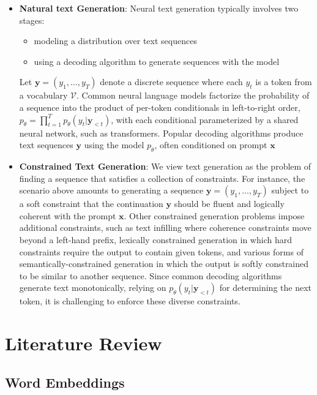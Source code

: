 \documentclass{article}
\begin{document}
\begin{itemize}
    \item \textbf{Natural text Generation}: Neural text generation typically involves two stages:
          \begin{itemize}
              \item modeling a distribution over text sequences
              \item using a decoding algorithm to generate sequences with the model
          \end{itemize}
          Let $\boldsymbol{y} = (y_1, \ldots, y_T)$ denote a discrete sequence where each $y_t$ is a token from a vocabulary $\mathcal{V}$. Common neural language models factorize the probability of a sequence into the product of per-token conditionals in left-to-right order, $p_{\theta} = \prod_{t=1}^{T} p_{\theta} (y_t | \boldsymbol{y}_{<t})$, with each conditional parameterized by a shared neural network, such as transformers. Popular decoding algorithms produce text sequences $\boldsymbol{y}$ using the model $p_{\theta}$, often conditioned on prompt $\boldsymbol{x}$
    \item \textbf{Constrained Text Generation}: We view text generation as the problem of finding a sequence that
          satisfies a collection of constraints. For instance, the scenario above amounts to generating a sequence $\boldsymbol{y} = (y_1, \ldots, y_T)$ subject to a soft constraint that the continuation $\boldsymbol{y}$ should be fluent and logically coherent with the prompt $\boldsymbol{x}$. Other constrained generation problems impose additional constraints, such as text infilling where coherence constraints move beyond a left-hand prefix, lexically constrained generation in which hard constraints require the output to contain given tokens, and various forms of semantically-constrained generation in which the output is softly constrained to be similar to another sequence. Since common decoding algorithms generate text monotonically, relying
          on $p_{\theta} (y_t | \boldsymbol{y}_{<t})$ for determining the next token, it is challenging to enforce these diverse constraints.
\end{itemize}







\section{Literature Review}

\subsection{Word Embeddings}
\end{document}
